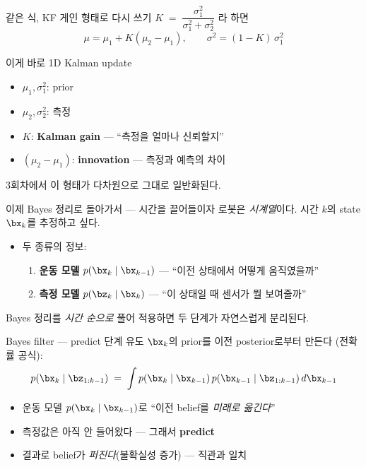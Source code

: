 \begin{frame}{같은 식, KF 게인 형태로 다시 쓰기}
  \footnotesize
  $K \;=\; \dfrac{\sigma_1^2}{\sigma_1^2 + \sigma_2^2}$ \; 라 하면
  \[
    \mu = \mu_1 + K(\mu_2 - \mu_1), \qquad \sigma^2 = (1-K)\,\sigma_1^2
  \]
  \pause
  \vspace{0.5em}
  \begin{block}{이게 바로 1D Kalman update}
    \begin{itemize}
      \item $\mu_1, \sigma_1^2$: prior
      \item $\mu_2, \sigma_2^2$: 측정
      \item $K$: \textbf{Kalman gain} — ``측정을 얼마나 신뢰할지''
      \item $(\mu_2 - \mu_1)$: \textbf{innovation} — 측정과 예측의 차이
    \end{itemize}
  \end{block}
  3회차에서 이 형태가 다차원으로 그대로 일반화된다.
\end{frame}

\begin{frame}{이제 Bayes 정리로 돌아가서 — 시간을 끌어들이자}
  로봇은 \emph{시계열}이다. 시간 $k$의 state $\bx_k$를 추정하고 싶다.
  \vspace{0.4em}
  \begin{itemize}
    \item 두 종류의 정보:
      \begin{enumerate}
        \item \textbf{운동 모델} $p(\bx_k \mid \bx_{k-1})$ — ``이전 상태에서 어떻게 움직였을까''
        \item \textbf{측정 모델} $p(\bz_k \mid \bx_k)$ — ``이 상태일 때 센서가 뭘 보여줄까''
      \end{enumerate}
  \end{itemize}
  \pause
  \vspace{0.3em}
  Bayes 정리를 \emph{시간 순으로} 풀어 적용하면 두 단계가 자연스럽게 분리된다.
\end{frame}

\begin{frame}{Bayes filter — predict 단계 유도}
  $\bx_k$의 prior를 이전 posterior로부터 만든다 (전확률 공식):
  \[
    p(\bx_k \mid \bz_{1:k-1}) \;=\;
    \int p(\bx_k \mid \bx_{k-1})\, p(\bx_{k-1} \mid \bz_{1:k-1})\, d\bx_{k-1}
  \]
  \begin{itemize}
    \item 운동 모델 $p(\bx_k \mid \bx_{k-1})$로 ``이전 belief를 \emph{미래로 옮긴다}''
    \item 측정값은 아직 안 들어왔다 — 그래서 \textbf{predict}
    \item 결과로 belief가 \emph{퍼진다}(불확실성 증가) — 직관과 일치
  \end{itemize}
\end{frame}


